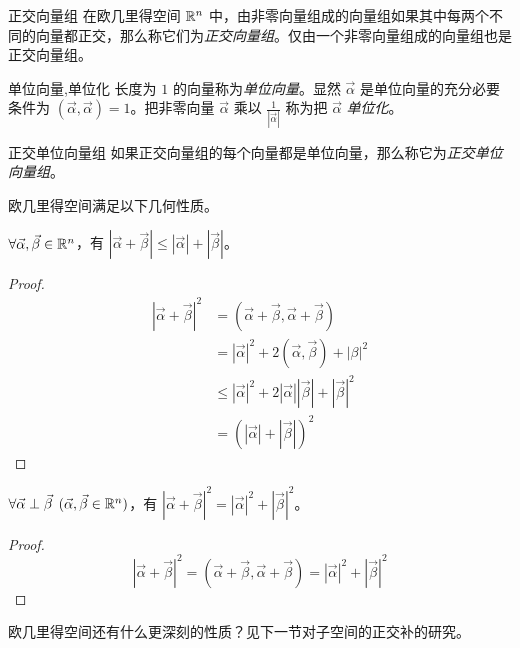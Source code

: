 \begin{definition}{正交向量组}
	在欧几里得空间 $\mathbb R^n$ 中，由非零向量组成的向量组如果其中每两个不同的向量都正交，那么称它们为\emph{正交向量组}。仅由一个非零向量组成的向量组也是正交向量组。
\end{definition}

\begin{definition}{单位向量,单位化}
	长度为 $1$ 的向量称为\emph{单位向量}。显然 $\vec \alpha$ 是单位向量的充分必要条件为 $(\vec \alpha, \vec \alpha) = 1$。把非零向量 $\vec \alpha$ 乘以 $\frac{1}{|\vec \alpha|}$ 称为把 $\vec \alpha$ \emph{单位化}。
\end{definition}

\begin{definition}{正交单位向量组}
	如果正交向量组的每个向量都是单位向量，那么称它为\emph{正交单位向量组}。
\end{definition}

欧几里得空间满足以下几何性质。

\begin{theorem}[三角形不等式]
	$\forall \vec \alpha, \vec \beta \in \mathbb R^n$，有 $|\vec \alpha + \vec \beta| \le |\vec \alpha| + |\vec \beta|$。
\end{theorem}

\begin{proof}
	$$
	\begin{aligned}
		|\vec \alpha + \vec \beta|^2 &= (\vec \alpha + \vec \beta, \vec \alpha + \vec \beta)
		\\&=
		|\vec \alpha|^2 + 2 (\vec \alpha, \vec \beta) + |\beta|^2
		\\&\le
		|\vec \alpha|^2 + 2|\vec \alpha||\vec \beta| + |\vec \beta|^2
		\\&=
		(|\vec \alpha| + |\vec \beta|)^2
	\end{aligned}
	$$
\end{proof}

\begin{theorem}[勾股定理]
	$\forall \vec \alpha \perp \vec \beta \pod{\vec \alpha, \vec \beta \in \mathbb R^n}$，有 $|\vec \alpha + \vec \beta|^2 = |\vec \alpha|^2 + |\vec \beta|^2$。
\end{theorem}

\begin{proof}
	$$
	|\vec \alpha + \vec \beta|^2 = (\vec \alpha + \vec \beta, \vec \alpha + \vec \beta) = |\vec \alpha|^2 + |\vec \beta|^2
	$$
\end{proof}

欧几里得空间还有什么更深刻的性质？见下一节对子空间的正交补的研究。